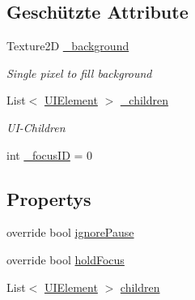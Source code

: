 \subsection*{Geschützte Attribute}
\begin{DoxyCompactItemize}
\item 
Texture2\-D \hyperlink{class_gruppe22_1_1_client_1_1_window_ae18ccb8e8b1bb5acf64ab6b39afd0018}{\-\_\-background}
\begin{DoxyCompactList}\small\item\em Single pixel to fill background \end{DoxyCompactList}\item 
List$<$ \hyperlink{class_gruppe22_1_1_client_1_1_u_i_element}{U\-I\-Element} $>$ \hyperlink{class_gruppe22_1_1_client_1_1_window_a3183f9f2663e2973529ddd494cbb847a}{\-\_\-children}
\begin{DoxyCompactList}\small\item\em U\-I-\/\-Children \end{DoxyCompactList}\item 
int \hyperlink{class_gruppe22_1_1_client_1_1_window_a2c5c9a090aecb62bb99a4a6c0e8c7e4c}{\-\_\-focus\-I\-D} = 0
\end{DoxyCompactItemize}
\subsection*{Propertys}
\begin{DoxyCompactItemize}
\item 
override bool \hyperlink{class_gruppe22_1_1_client_1_1_window_aed543c8546dcd049df9ef4e2742af0bd}{ignore\-Pause}
\item 
override bool \hyperlink{class_gruppe22_1_1_client_1_1_window_ab198ef577055a03ab657cefc633999a3}{hold\-Focus}
\item 
List$<$ \hyperlink{class_gruppe22_1_1_client_1_1_u_i_element}{U\-I\-Element} $>$ \hyperlink{class_gruppe22_1_1_client_1_1_window_a8480b3645d012595c617cf1a39ad5a72}{children}
\end{DoxyCompactItemize}


